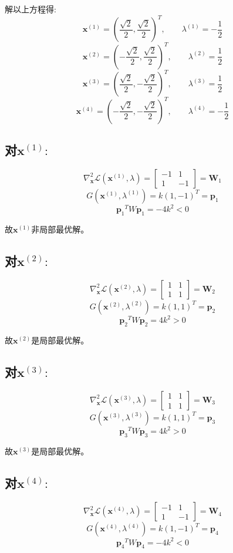 \documentclass[UTF8]{ctexart}
\begin{document}
\begin{enumerate}
解以上方程得:
\[\bm{x}^{(1)}=(\dfrac{\sqrt{2}}{2},\dfrac{\sqrt{2}}{2})^T,\qquad \lambda^{(1)}=-\dfrac{1}{2}\]
\[\bm{x}^{(2)}=(-\dfrac{\sqrt{2}}{2},\dfrac{\sqrt{2}}{2})^T,\qquad \lambda^{(2)}=\dfrac{1}{2}\]
\[\bm{x}^{(3)}=(\dfrac{\sqrt{2}}{2},-\dfrac{\sqrt{2}}{2})^T,\qquad \lambda^{(3)}=\dfrac{1}{2}\]
\[\bm{x}^{(4)}=(-\dfrac{\sqrt{2}}{2},-\dfrac{\sqrt{2}}{2})^T,\qquad \lambda^{(4)}=-\dfrac{1}{2}\]

\subsection*{对$\bm{x}^{(1)}:$}
\[\nabla_{\bm{x}}^2\mathcal{L}(\bm{x}^{(1)},\lambda)=\begin{bmatrix}
-1 &1\\
1&-1
\end{bmatrix}=\bm{W}_1\]
\[G(\bm{x}^{(1)},\lambda^{(1)})=k(1,-1)^T=\bm{p}_1\]
\[{\bm{p}_1}^TW\bm{p}_1=-4k^2<0\]

故$\bm{x}^{(1)}$非局部最优解。




\subsection*{对$\bm{x}^{(2)}:$}
\[\nabla_{\bm{x}}^2\mathcal{L}(\bm{x}^{(2)},\lambda)=\begin{bmatrix}
1 &1\\
1&1
\end{bmatrix}=\bm{W}_2\]
\[G(\bm{x}^{(2)},\lambda^{(2)})=k(1,1)^T=\bm{p}_2\]
\[{\bm{p}_2}^TW\bm{p}_2=4k^2>0\]

故$\bm{x}^{(2)}$是局部最优解。



\subsection*{对$\bm{x}^{(3)}:$}
\[\nabla_{\bm{x}}^2\mathcal{L}(\bm{x}^{(3)},\lambda)=\begin{bmatrix}
1 &1\\
1&1
\end{bmatrix}=\bm{W}_3\]
\[G(\bm{x}^{(3)},\lambda^{(3)})=k(1,1)^T=\bm{p}_3\]
\[{\bm{p}_3}^TW\bm{p}_3=4k^2>0\]

故$\bm{x}^{(3)}$是局部最优解。


\subsection*{对$\bm{x}^{(4)}:$}
\[\nabla_{\bm{x}}^2\mathcal{L}(\bm{x}^{(4)},\lambda)=\begin{bmatrix}
-1 &1\\
1&-1
\end{bmatrix}=\bm{W}_4\]
\[G(\bm{x}^{(4)},\lambda^{(4)})=k(1,-1)^T=\bm{p}_4\]
\[{\bm{p}_4}^TW\bm{p}_4=-4k^2<0\]


\end{enumerate}
\end{document}

